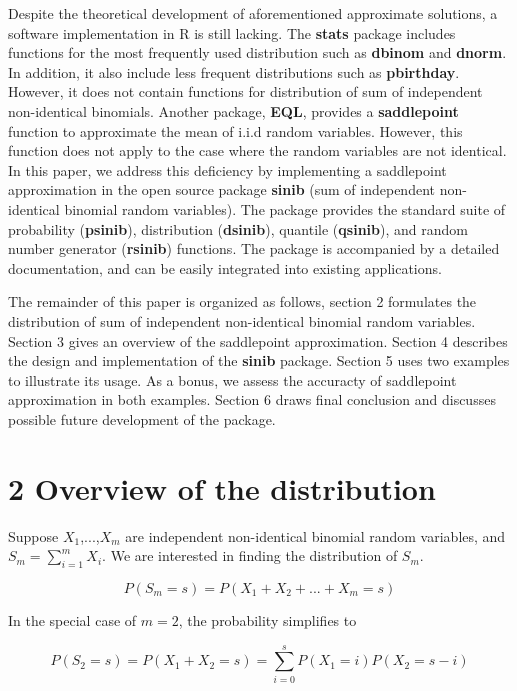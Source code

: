 Despite the theoretical development of aforementioned approximate solutions, a software implementation in R is still lacking. The \textbf{stats} package includes functions for the most frequently used distribution such as \textbf{dbinom} and \textbf{dnorm}. In addition, it also include less frequent distributions such as \textbf{pbirthday}. However, it does not contain functions for distribution of sum of independent non-identical binomials. Another package, \textbf{EQL}, provides a \textbf{saddlepoint} function to approximate the mean of i.i.d random variables. However, this function does not apply to the case where the random variables are not identical. In this paper, we address this deficiency by implementing a saddlepoint approximation in the open source package \textbf{sinib} (sum of independent non-identical binomial random variables). The package provides the standard suite of probability (\textbf{psinib}), distribution (\textbf{dsinib}), quantile (\textbf{qsinib}), and random number generator (\textbf{rsinib}) functions. The package is accompanied by a detailed documentation, and can be easily integrated into existing applications.

The remainder of this paper is organized as follows, section 2 formulates the distribution of sum of independent non-identical binomial random variables. Section 3 gives an overview of the saddlepoint approximation. Section 4 describes the design and implementation of the \textbf{sinib} package. Section 5 uses two examples to illustrate its usage. As a bonus, we assess the accuracty of saddlepoint approximation in both examples. Section 6 draws final conclusion and discusses possible future development of the package. 

\section{2 Overview of the distribution}


Suppose $X_1$,...,$X_m$ are independent non-identical binomial random variables, and $S_m = \sum_{i=1}^{m} X_i$. We are interested in finding the distribution of $S_m$. 

\begin{equation}
P(S_m = s) = P(X_1+X_2+...+X_m = s)
\end{equation}

In the special case of $m = 2$, the probability simplifies to 

\begin{equation}
P(S_2=s) = P(X_1+X_2=s) = \sum_{i=0}^s P(X_1=i) P(X_2=s-i)
\label{eq:2}
\end{equation}

